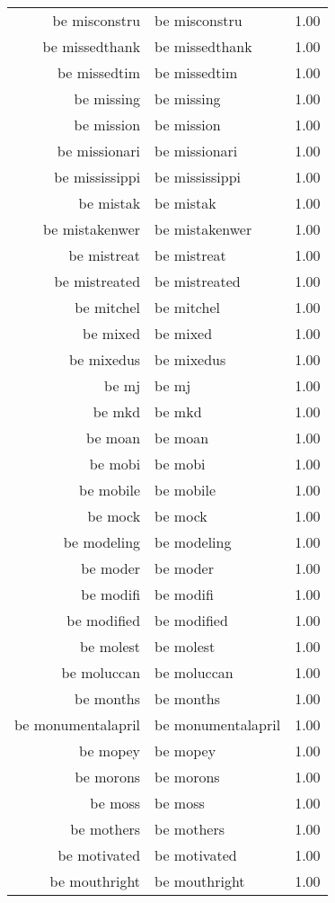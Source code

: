 \begin{table}[ht]
\begin{tabular}{rlr}
  be misconstru & be misconstru & 1.00 \\ 
  be missedthank & be missedthank & 1.00 \\ 
  be missedtim & be missedtim & 1.00 \\ 
  be missing & be missing & 1.00 \\ 
  be mission & be mission & 1.00 \\ 
  be missionari & be missionari & 1.00 \\ 
  be mississippi & be mississippi & 1.00 \\ 
  be mistak & be mistak & 1.00 \\ 
  be mistakenwer & be mistakenwer & 1.00 \\ 
  be mistreat & be mistreat & 1.00 \\ 
  be mistreated & be mistreated & 1.00 \\ 
  be mitchel & be mitchel & 1.00 \\ 
  be mixed & be mixed & 1.00 \\ 
  be mixedus & be mixedus & 1.00 \\ 
  be mj & be mj & 1.00 \\ 
  be mkd & be mkd & 1.00 \\ 
  be moan & be moan & 1.00 \\ 
  be mobi & be mobi & 1.00 \\ 
  be mobile & be mobile & 1.00 \\ 
  be mock & be mock & 1.00 \\ 
  be modeling & be modeling & 1.00 \\ 
  be moder & be moder & 1.00 \\ 
  be modifi & be modifi & 1.00 \\ 
  be modified & be modified & 1.00 \\ 
  be molest & be molest & 1.00 \\ 
  be moluccan & be moluccan & 1.00 \\ 
  be months & be months & 1.00 \\ 
  be monumentalapril & be monumentalapril & 1.00 \\ 
  be mopey & be mopey & 1.00 \\ 
  be morons & be morons & 1.00 \\ 
  be moss & be moss & 1.00 \\ 
  be mothers & be mothers & 1.00 \\ 
  be motivated & be motivated & 1.00 \\ 
  be mouthright & be mouthright & 1.00 \\ 

\end{tabular}
\end{table}
